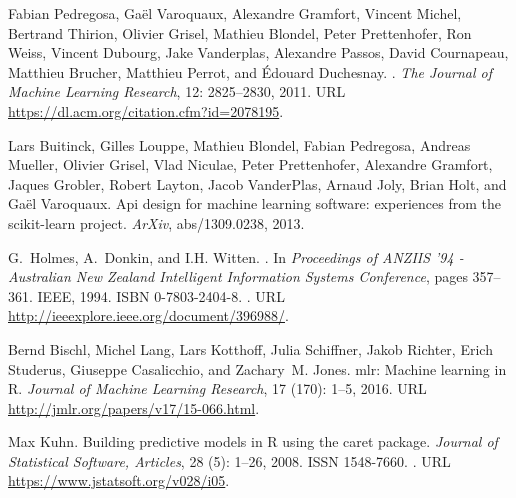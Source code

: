 \documentclass{article}
\begin{document}
\begin{thebibliography}{18}
Fabian Pedregosa, Ga{\"{e}}l Varoquaux, Alexandre Gramfort, Vincent Michel,
  Bertrand Thirion, Olivier Grisel, Mathieu Blondel, Peter Prettenhofer, Ron
  Weiss, Vincent Dubourg, Jake Vanderplas, Alexandre Passos, David Cournapeau,
  Matthieu Brucher, Matthieu Perrot, and {\'{E}}douard Duchesnay.
.
\newblock \emph{The Journal of Machine Learning Research}, 12:
  2825--2830, 2011.
\newblock URL \url{https://dl.acm.org/citation.cfm?id=2078195}.

Lars Buitinck, Gilles Louppe, Mathieu Blondel, Fabian Pedregosa, Andreas
  Mueller, Olivier Grisel, Vlad Niculae, Peter Prettenhofer, Alexandre
  Gramfort, Jaques Grobler, Robert Layton, Jacob VanderPlas, Arnaud Joly, Brian
  Holt, and Ga{\"e}l Varoquaux.
\newblock Api design for machine learning software: experiences from the
  scikit-learn project.
\newblock \emph{ArXiv}, abs/1309.0238, 2013.

G.~Holmes, A.~Donkin, and I.H. Witten.
.
\newblock In \emph{Proceedings of ANZIIS '94 - Australian New Zealand
  Intelligent Information Systems Conference}, pages 357--361. IEEE, 1994.
\newblock ISBN 0-7803-2404-8.
\newblock {}.
\newblock URL \url{http://ieeexplore.ieee.org/document/396988/}.

Bernd Bischl, Michel Lang, Lars Kotthoff, Julia Schiffner, Jakob Richter, Erich
  Studerus, Giuseppe Casalicchio, and Zachary~M. Jones.
\newblock mlr: Machine learning in {R}.
\newblock \emph{Journal of Machine Learning Research}, 17
  (170): 1--5, 2016.
\newblock URL \url{http://jmlr.org/papers/v17/15-066.html}.

Max Kuhn.
\newblock Building predictive models in {R} using the caret package.
\newblock \emph{Journal of Statistical Software, Articles}, 28
  (5): 1--26, 2008.
\newblock ISSN 1548-7660.
\newblock {}.
\newblock URL \url{https://www.jstatsoft.org/v028/i05}.


\end{thebibliography}
\end{document}

